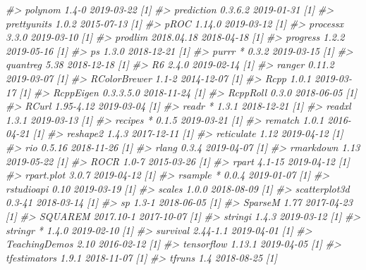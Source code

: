 \documentclass[]{krantz}
\makeatletter
\newenvironment{Shaded}{\begin{snugshade}}{\end{snugshade}}
\newcommand{\CommentTok}[1]{\textcolor[rgb]{0.37,0.37,0.37}{\textit{#1}}}
\newenvironment{kframe}{%
\medskip{}
\setlength{\fboxsep}{.8em}
 \def\at@end@of@kframe{}%
 \ifinner\ifhmode%
  \def\at@end@of@kframe{\end{minipage}}%
  \begin{minipage}{\columnwidth}%
 \fi\fi%
 \def\FrameCommand##1{\hskip\@totalleftmargin \hskip-\fboxsep
 \colorbox{shadecolor}{##1}\hskip-\fboxsep
     \hskip-\linewidth \hskip-\@totalleftmargin \hskip\columnwidth}%
 \MakeFramed {\advance\hsize-\width
   \@totalleftmargin\z@ \linewidth\hsize
   \@setminipage}}%
 {\par\unskip\endMakeFramed%
 \at@end@of@kframe}
\renewenvironment{Shaded}{\begin{kframe}}{\end{kframe}}
\makeatother
\begin{document}
\begin{Shaded}
\begin{Highlighting}[]
\CommentTok{#>    polynom         1.4-0      2019-03-22 [1]}
\CommentTok{#>    prediction      0.3.6.2    2019-01-31 [1]}
\CommentTok{#>    prettyunits     1.0.2      2015-07-13 [1]}
\CommentTok{#>    pROC            1.14.0     2019-03-12 [1]}
\CommentTok{#>    processx        3.3.0      2019-03-10 [1]}
\CommentTok{#>    prodlim         2018.04.18 2018-04-18 [1]}
\CommentTok{#>    progress        1.2.2      2019-05-16 [1]}
\CommentTok{#>    ps              1.3.0      2018-12-21 [1]}
\CommentTok{#>    purrr         * 0.3.2      2019-03-15 [1]}
\CommentTok{#>    quantreg        5.38       2018-12-18 [1]}
\CommentTok{#>    R6              2.4.0      2019-02-14 [1]}
\CommentTok{#>    ranger          0.11.2     2019-03-07 [1]}
\CommentTok{#>    RColorBrewer    1.1-2      2014-12-07 [1]}
\CommentTok{#>    Rcpp            1.0.1      2019-03-17 [1]}
\CommentTok{#>    RcppEigen       0.3.3.5.0  2018-11-24 [1]}
\CommentTok{#>    RcppRoll        0.3.0      2018-06-05 [1]}
\CommentTok{#>    RCurl           1.95-4.12  2019-03-04 [1]}
\CommentTok{#>    readr         * 1.3.1      2018-12-21 [1]}
\CommentTok{#>    readxl          1.3.1      2019-03-13 [1]}
\CommentTok{#>    recipes       * 0.1.5      2019-03-21 [1]}
\CommentTok{#>    rematch         1.0.1      2016-04-21 [1]}
\CommentTok{#>    reshape2        1.4.3      2017-12-11 [1]}
\CommentTok{#>    reticulate      1.12       2019-04-12 [1]}
\CommentTok{#>    rio             0.5.16     2018-11-26 [1]}
\CommentTok{#>    rlang           0.3.4      2019-04-07 [1]}
\CommentTok{#>    rmarkdown       1.13       2019-05-22 [1]}
\CommentTok{#>    ROCR            1.0-7      2015-03-26 [1]}
\CommentTok{#>    rpart           4.1-15     2019-04-12 [1]}
\CommentTok{#>    rpart.plot      3.0.7      2019-04-12 [1]}
\CommentTok{#>    rsample       * 0.0.4      2019-01-07 [1]}
\CommentTok{#>    rstudioapi      0.10       2019-03-19 [1]}
\CommentTok{#>    scales          1.0.0      2018-08-09 [1]}
\CommentTok{#>    scatterplot3d   0.3-41     2018-03-14 [1]}
\CommentTok{#>    sp              1.3-1      2018-06-05 [1]}
\CommentTok{#>    SparseM         1.77       2017-04-23 [1]}
\CommentTok{#>    SQUAREM         2017.10-1  2017-10-07 [1]}
\CommentTok{#>    stringi         1.4.3      2019-03-12 [1]}
\CommentTok{#>    stringr       * 1.4.0      2019-02-10 [1]}
\CommentTok{#>    survival        2.44-1.1   2019-04-01 [1]}
\CommentTok{#>    TeachingDemos   2.10       2016-02-12 [1]}
\CommentTok{#>    tensorflow      1.13.1     2019-04-05 [1]}
\CommentTok{#>    tfestimators    1.9.1      2018-11-07 [1]}
\CommentTok{#>    tfruns          1.4        2018-08-25 [1]}

\end{Highlighting}
\end{Shaded}
\end{document}
